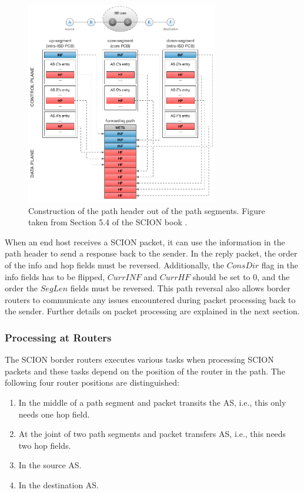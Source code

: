 \begin{figure}[h]
    \centering
    \includegraphics[width=0.75\textwidth]{figures/scion_path_header_construction.png}
    \caption{Construction of the path header out of the path segments. Figure taken from Section 5.4 of the SCION book \cite{Perrig2022}.}
    \label{fig:scion_path_header_contruction}
\end{figure}

When an end host receives a SCION packet, it can use the information in the path header to send a response back to the sender.
In the reply packet, the order of the info and hop fields must be reversed.
Additionally, the $ConsDir$ flag in the info fields has to be flipped, $CurrINF$ and $CurrHF$ should be set to 0, and the order the $SegLen$ fields must be reversed.
This path reversal also allows border routers to communicate any issues encountered during packet processing back to the sender.
Further details on packet processing are explained in the next section.

\subsubsection{Processing at Routers}

The SCION border routers executes various tasks when processing SCION packets and these tasks depend on the position of the router in the path.
The following four router positions are distinguished:

\begin{enumerate}[label=P\arabic*]
    \item In the middle of a path segment and packet transits the AS, i.e., this only needs one hop field.
    \item At the joint of two path segments and packet transfers AS, i.e., this needs two hop fields.
    \item In the source AS.
    \item In the destination AS.
\end{enumerate}

